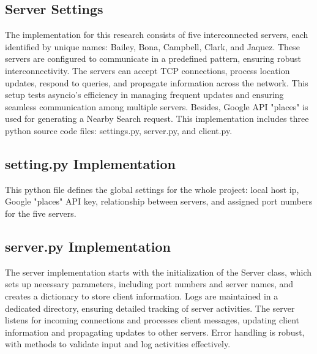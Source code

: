 \documentclass[letterpaper,twocolumn,10pt]{article}
\begin{document}
\subsection{Server Settings}
\noindent{}The implementation for this research consists of five interconnected servers, each identified by unique names: Bailey, Bona, Campbell, Clark, and Jaquez. These servers are configured to communicate in a predefined pattern, ensuring robust interconnectivity. The servers can accept TCP connections, process location updates, respond to queries, and propagate information across the network. This setup tests asyncio's efficiency in managing frequent updates and ensuring seamless communication among multiple servers. Besides, Google API "places" is used for generating a Nearby Search request. This implementation includes three python source code files: settings.py, server.py, and client.py.

\subsection{setting.py Implementation}
\noindent{}This python file defines the global settings for the whole project: local host ip, Google "places" API key, relationship between servers, and assigned port numbers for the five servers.

\subsection{server.py Implementation}
\noindent{}The server implementation starts with the initialization of the Server class, which sets up necessary parameters, including port numbers and server names, and creates a dictionary to store client information. Logs are maintained in a dedicated directory, ensuring detailed tracking of server activities. The server listens for incoming connections and processes client messages, updating client information and propagating updates to other servers. Error handling is robust, with methods to validate input and log activities effectively.
\vspace{5pt}
\end{document}
